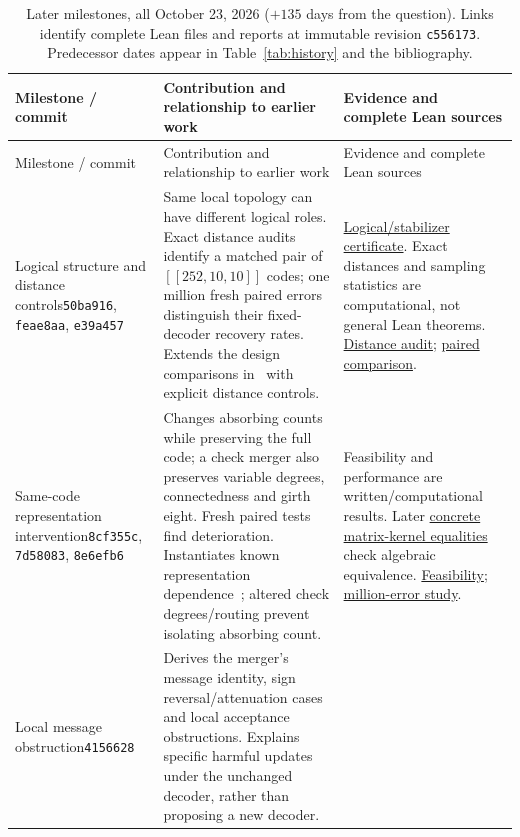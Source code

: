 \documentclass[11pt]{article}
\theoremstyle{definition}
\theoremstyle{remark}
\newcommand{\laterlean}[2]{\href{https://github.com/alectionary/vibe-math/blob/c5561734e1b91c55911703ef4930f6e718624453/formalization/dyadic-rank/#1.lean}{#2}}
\newcommand{\laterreport}[2]{\href{https://github.com/alectionary/vibe-math/blob/c5561734e1b91c55911703ef4930f6e718624453/formalization/cyclic-lifts/#1.md}{#2}}
\begin{document}
\begingroup\small
\setlength{\tabcolsep}{4pt}
\renewcommand{\arraystretch}{1.12}
\begin{longtable}{P{.19\linewidth}P{.36\linewidth}P{.36\linewidth}}
\caption{Later milestones, all October 23, 2026 ($+135$ days from the
question). Links identify complete Lean files and reports at immutable
revision \texttt{c556173}. Predecessor dates appear in
Table~\ref{tab:history} and the bibliography.}\label{tab:later-history}\\
\toprule
Milestone / commit & Contribution and relationship to earlier work & Evidence and complete Lean sources \\
\midrule\endfirsthead
\toprule
Milestone / commit & Contribution and relationship to earlier work & Evidence and complete Lean sources \\
\midrule\endhead
\bottomrule\endfoot
Logical structure and distance controls\newline\texttt{50ba916}, \texttt{feae8aa}, \texttt{e39a457}
& Same local topology can have different logical roles. Exact distance audits identify a matched pair of $[[252,10,10]]$ codes; one million fresh paired errors distinguish their fixed-decoder recovery rates. Extends the design comparisons in~\cite{RDV2025} with explicit distance controls.
& \laterlean{CyclicLogicalSix}{Logical/stabilizer certificate}. Exact distances and sampling statistics are computational, not general Lean theorems. \laterreport{DISTANCE-MATCHED}{Distance audit}; \laterreport{MILLION-PAIRED}{paired comparison}. \\
Same-code representation intervention\newline\texttt{8cf355c}, \texttt{7d58083}, \texttt{8e6efb6}
& Changes absorbing counts while preserving the full code; a check merger also preserves variable degrees, connectedness and girth eight. Fresh paired tests find deterioration. Instantiates known representation dependence~\cite{Rigby2019,Miao2022}; altered check degrees/routing prevent isolating absorbing count.
& Feasibility and performance are written/computational results. Later \laterlean{CyclicMergedWitnesses}{concrete matrix-kernel equalities} check algebraic equivalence. \laterreport{DEGREE-PRESERVING}{Feasibility}; \laterreport{MERGED-MILLION}{million-error study}. \\
Local message obstruction\newline\texttt{4156628}
& Derives the merger's message identity, sign reversal/attenuation cases and local acceptance obstructions. Explains specific harmful updates under the unchanged decoder, rather than proposing a new decoder.

\end{longtable}
\end{document}
